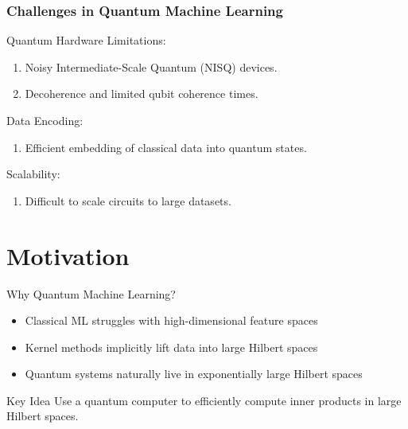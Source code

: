 \documentclass{beamer}
\begin{document}
\begin{frame}
\frametitle{Challenges in Quantum Machine Learning}

\begin{block}{Quantum Hardware Limitations: }
\begin{enumerate}
\item Noisy Intermediate-Scale Quantum (NISQ) devices.

\item Decoherence and limited qubit coherence times.
\end{enumerate}

\noindent
\end{block}

\begin{block}{Data Encoding: }
\begin{enumerate}
\item Efficient embedding of classical data into quantum states.
\end{enumerate}

\noindent
\end{block}

\begin{block}{Scalability: }
\begin{enumerate}
\item Difficult to scale circuits to large datasets.
\end{enumerate}

\noindent
\end{block}
\end{frame}

\section{Motivation}

\begin{frame}{Why Quantum Machine Learning?}
\begin{itemize}
\item Classical ML struggles with high-dimensional feature spaces
\item Kernel methods implicitly lift data into large Hilbert spaces
\item Quantum systems naturally live in exponentially large Hilbert spaces
\end{itemize}

\medskip

\begin{block}{Key Idea}
Use a quantum computer to efficiently compute inner products in large Hilbert spaces.
\end{block}
\end{frame}
\end{document}
